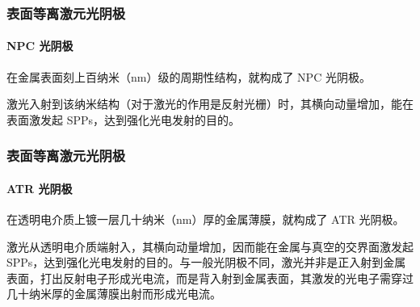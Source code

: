 \documentclass[a4paper]{article}
\begin{document}
\begin{frame}[label=current]
	\frametitle{表面等离激元光阴极}
	\framesubtitle{NPC 光阴极}
	在金属表面刻上百纳米（nm）级的周期性结构，就构成了 NPC 光阴极。
	\begin{physics}
	激光入射到该纳米结构（对于激光的作用是反射光栅）时，其横向动量增加，能在表面激发起 SPPs，达到强化光电发射的目的。
	\end{physics}
	
	
\end{frame}

\begin{frame}[label=current]
	\frametitle{表面等离激元光阴极}
	\framesubtitle{ATR 光阴极}
	在透明电介质上镀一层几十纳米（nm）厚的金属薄膜，就构成了 ATR 光阴极。
	\begin{physics}
	激光从透明电介质端射入，其横向动量增加，因而能在金属与真空的交界面激发起 SPPs，达到强化光电发射的目的。与一般光阴极不同，激光并非是正入射到金属表面，打出反射电子形成光电流，而是背入射到金属表面，其激发的光电子需穿过几十纳米厚的金属薄膜出射而形成光电流。
	\end{physics}
	
	
\end{frame}

%
\end{document}
